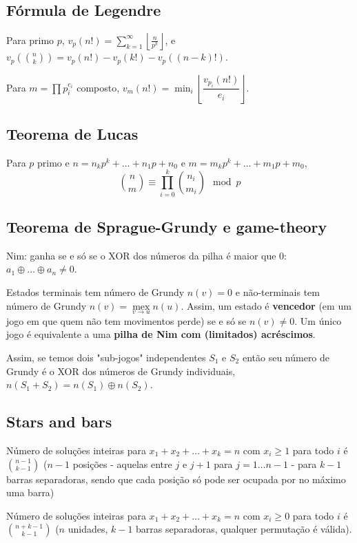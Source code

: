 \subsection{Fórmula de Legendre}

Para primo $p$, $v_p(n!) = \sum_{k=1}^{\infty} \left\lfloor \frac{n}{p^k} \right\rfloor$, e
$v_p\left(\binom{n}{k}\right) = v_p(n!) - v_p(k!) - v_p((n-k)!)$.

Para $m = \prod p_i^{e_i}$ composto, $v_m(n!) = \min_i \left\lfloor \dfrac{v_{p_i}(n!)}{e_i} \right\rfloor$.

\subsection{Teorema de Lucas}

Para $p$ primo e $n = n_k p^k + \dotsc + n_1 p + n_0$ e $m = m_k p^k + \dotsc + m_1 p + m_0$,
\[\binom{n}{m} \equiv \prod_{i=0}^{k}\binom{n_i}{m_i} \mod p\]

\subsection{Teorema de Sprague-Grundy e game-theory}

Nim: ganha se e só se o XOR dos números da pilha é maior que $0$: $a_1 \oplus \dotsc \oplus a_n \neq 0$.

Estados terminais tem número de Grundy $n(v) = 0$ e não-terminais tem número de Grundy $n(v) = \operatorname{mex}\limits_{v \to u}n(u)$. Assim,
um estado é \textbf{vencedor} (em um jogo em que quem não tem movimentos perde) se e só se $n(v) \neq 0$.
Um único jogo é equivalente a uma \textbf{pilha de Nim com (limitados) acréscimos}.

Assim, se temos dois "sub-jogos" independentes $S_1$ e $S_2$ então seu número de Grundy é o XOR dos números de Grundy individuais, $n(S_1 + S_2) = n(S_1) \oplus n(S_2)$.

\subsection{Stars and bars}

Número de soluções inteiras para $x_1 + x_2 + \dotsc + x_k = n$ com $x_i \geq 1$ para todo $i$ é $\binom{n - 1}{k - 1}$
($n-1$ posições - aquelas entre $j$ e $j+1$ para $j=1\dotsc n-1$ - para $k-1$ barras separadoras, sendo que cada posição só pode ser ocupada por no máximo uma barra)

Número de soluções inteiras para $x_1 + x_2 + \dotsc + x_k = n$ com $x_i \geq 0$ para todo $i$ é $\binom {n + k - 1}{k - 1}$
($n$ unidades, $k-1$ barras separadoras, qualquer permutação é válida).
